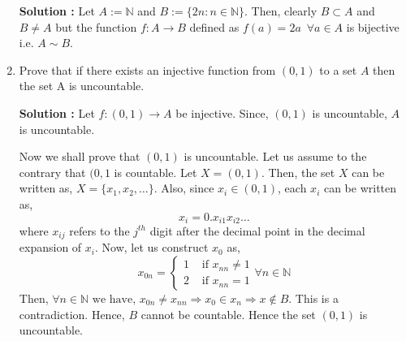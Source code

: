 \documentclass[10pt]{article}
\newcommand{\nn}{\mathbb{N}}
\begin{document}
\begin{enumerate}
    \textbf{Solution : }Let $A := \nn$ and $B := \{2n : n \in \nn \}$. Then, clearly $B \subset A$ and $B \neq A$ but the function $f : A \to B$ defined as $f(a) = 2a \,\,\, \forall a \in A$ is bijective i.e. $A \sim B$.
    \item Prove that if there exists an injective function from $(0, 1)$ to a set $A$ then the set A is uncountable.

	    \textbf{Solution :} Let $f : (0, 1) \to A$ be injective. Since, $(0, 1)$ is uncountable,
	    $A$ is uncountable.

	    Now we shall prove that $(0, 1)$ is uncountable. Let us assume to the contrary that $(0, 1$ is countable.
	    Let $X = (0, 1)$. Then, the set $X$ can be written as, $X = \{ x_1, x_2, \dots \}$. Also, since $x_i \in (0, 1)$, each $x_i$ can be written as,
	    $$x_i = 0.x_{i1}x_{i2} \dots $$ where $x_{ij}$ refers to the $j^{th}$ digit after the decimal point in the decimal
	    expansion of $x_i$.
	    Now, let us construct $x_0$ as,
	    \begin{equation*}
		    x_{0n} = 
		    \begin{cases}
			    1 & \text{ if } x_{nn} \neq 1 \\
			    2 & \text{ if } x_{nn} = 1
		    \end{cases}
		    \forall n \in \nn
	    \end{equation*}
	    Then, $\forall n \in \nn \text{ we have, } x_{0n} \neq x_{nn} \Rightarrow x_0 \in x_n \Rightarrow x \notin B$. This is a contradiction. Hence, $B$ cannot be countable.
	    Hence the set $(0, 1)$ is uncountable.



\end{enumerate}
\end{document}
